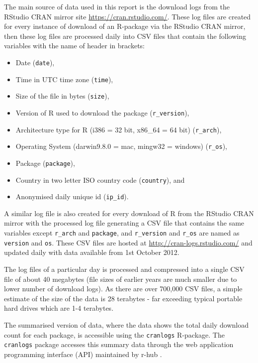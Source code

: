 \documentclass[
]{book}
\providecommand{\tightlist}{%
  \setlength{\itemsep}{0pt}\setlength{\parskip}{0pt}}
\begin{document}
The main source of data used in this report is the download logs from the RStudio CRAN mirror site \url{https://cran.rstudio.com/}. These log files are created for every instance of download of an R-package via the RStudio CRAN mirror, then these log files are processed daily into CSV files that contain the following variables with the name of header in brackets:

\begin{itemize}
\tightlist
\item
  Date (\texttt{date}),
\item
  Time in UTC time zone (\texttt{time}),
\item
  Size of the file in bytes (\texttt{size}),
\item
  Version of R used to download the package (\texttt{r\_version}),
\item
  Architecture type for R (i386 = 32 bit, x86\_64 = 64 bit) (\texttt{r\_arch}),
\item
  Operating System (darwin9.8.0 = mac, mingw32 = windows) (\texttt{r\_os}),
\item
  Package (\texttt{package}),
\item
  Country in two letter ISO country code (\texttt{country}), and
\item
  Anonymised daily unique id (\texttt{ip\_id}).
\end{itemize}

A similar log file is also created for every download of R from the RStudio CRAN mirror with the processed log file generating a CSV file that contains the same variables except \texttt{r\_arch} and \texttt{package}, and \texttt{r\_version} and \texttt{r\_os} are named as \texttt{version} and \texttt{os}. These CSV files are hosted at \url{http://cran-logs.rstudio.com/} and updated daily with data available from 1st October 2012.

The log files of a particular day is processed and compressed into a single CSV file of about 40 megabytes (file sizes of earlier years are much smaller due to lower number of download logs). As there are over 700,000 CSV files, a simple estimate of the size of the data is 28 terabytes - far exceeding typical portable hard drives which are 1-4 terabytes.

The summarised version of data, where the data shows the total daily download count for each package, is accessible using the \texttt{cranlogs} R-package. The \texttt{cranlogs} package accesses this summary data through the web application programming interface (API) maintained by r-hub \autocite{rhub}.
\end{document}

